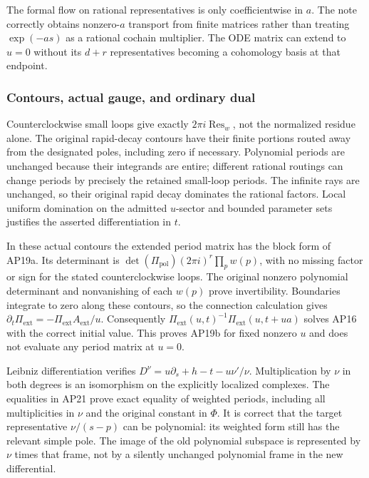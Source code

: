 The formal flow on rational representatives is only coefficientwise in \(a\). The note correctly obtains nonzero-\(a\) transport from finite matrices rather than treating \(\exp(-as)\) as a rational cochain multiplier. The ODE matrix can extend to \(u=0\) without its \(d+r\) representatives becoming a cohomology basis at that endpoint.

\subsubsection{Contours, actual gauge, and ordinary dual}\label{endpoint-analytic_pole_review--contours-actual-gauge-and-ordinary-dual}

Counterclockwise small loops give exactly \(2\pi i\operatorname{Res}_w\), not the normalized residue alone. The original rapid-decay contours have their finite portions routed away from the designated poles, including zero if necessary. Polynomial periods are unchanged because their integrands are entire; different rational routings can change periods by precisely the retained small-loop periods. The infinite rays are unchanged, so their original rapid decay dominates the rational factors. Local uniform domination on the admitted \(u\)-sector and bounded parameter sets justifies the asserted differentiation in \(t\).

In these actual contours the extended period matrix has the block form of AP19a. Its determinant is \(\det(\Pi_{\mathrm{pol}})(2\pi i)^r\prod_p w(p)\), with no missing factor or sign for the stated counterclockwise loops. The original nonzero polynomial determinant and nonvanishing of each \(w(p)\) prove invertibility. Boundaries integrate to zero along these contours, so the connection calculation gives \(\partial_t\Pi_{\mathrm{ext}}=-\Pi_{\mathrm{ext}}A_{\mathrm{ext}}/u\). Consequently \(\Pi_{\mathrm{ext}}(u,t)^{-1}\Pi_{\mathrm{ext}}(u,t+ua)\) solves AP16 with the correct initial value. This proves AP19b for fixed nonzero \(u\) and does not evaluate any period matrix at \(u=0\).

Leibniz differentiation verifies \(D^\nu=u\partial_s+h-t-u\nu'/\nu\). Multiplication by \(\nu\) in both degrees is an isomorphism on the explicitly localized complexes. The equalities in AP21 prove exact equality of weighted periods, including all multiplicities in \(\nu\) and the original constant in \(\Phi\). It is correct that the target representative \(\nu/(s-p)\) can be polynomial: its weighted form still has the relevant simple pole. The image of the old polynomial subspace is represented by \(\nu\) times that frame, not by a silently unchanged polynomial frame in the new differential.

